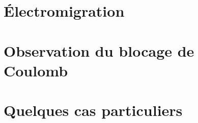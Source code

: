 \section{Électromigration}
\section{Observation du blocage de Coulomb}
\section{Quelques cas particuliers}
